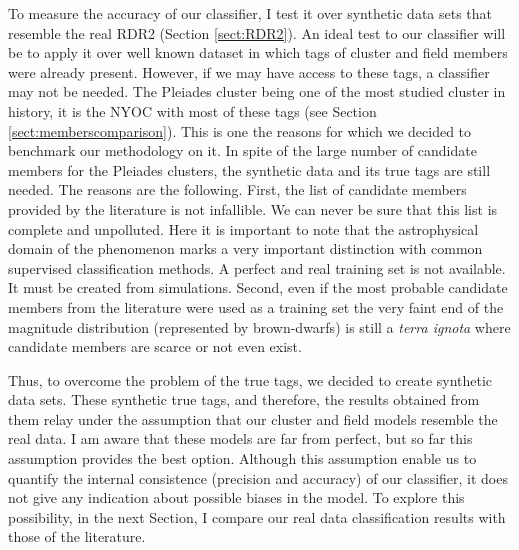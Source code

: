 To measure the accuracy of our classifier, I test it over synthetic data sets that resemble the real RDR2 (Section \ref{sect:RDR2}). An ideal test to our classifier will be to apply it over well known dataset in which tags of cluster and field members were already present. However, if we may have access to these tags, a classifier may not be needed. The Pleiades cluster being one of the most studied cluster in history, it is the NYOC with most of these tags (see Section \ref{sect:memberscomparison}). This is one the reasons for which we decided to benchmark our methodology on it. In spite of the large number of candidate members for the Pleiades clusters, the synthetic data and its true tags are still needed. The reasons are the following. First, the list of candidate members provided by the literature is not infallible. We can never be sure that this list is complete and unpolluted. Here it is important to note that the astrophysical domain of the phenomenon marks a very important distinction with common supervised classification methods. A perfect and real training set is not available. It must be created from simulations. Second, even if the most probable candidate members from the literature were used as a training set \cite[as done for example by][]{Sarro2014} the very faint end of the magnitude distribution (represented by brown-dwarfs) is still a \emph{terra ignota} where candidate members are scarce or not even exist. 

Thus, to overcome the problem of the true tags, we decided to create synthetic data sets. These synthetic true tags, and therefore, the results obtained from them relay under the assumption that our cluster and field models resemble the real data. I am aware that these models are far from perfect, but so far this assumption provides the best option. Although this assumption enable us to quantify the internal consistence (precision and accuracy) of our classifier, it does not give any indication about possible biases in the model. To explore this possibility, in the next Section, I compare our real data classification results with those of the literature.

